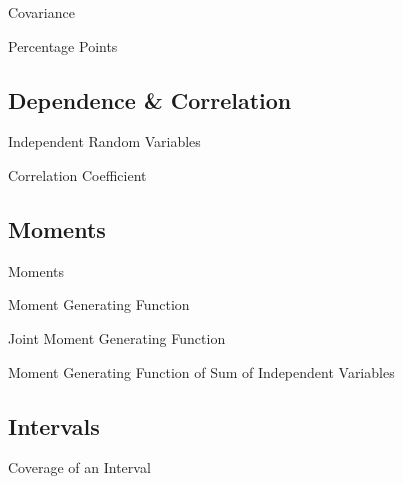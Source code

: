 \documentclass[11pt,a4paper]{article}
\begin{document}
\begin{definition}{Covariance}

\end{definition}

\begin{definition}{Percentage Points}

\end{definition}

\subsection{Dependence \& Correlation}

\begin{definition}{Independent Random Variables}
\end{definition}

\begin{definition}{Correlation Coefficient}
\end{definition}

\subsection{Moments}

\begin{definition}{Moments}

\end{definition}

\begin{definition}{Moment Generating Function}
\end{definition}

\begin{definition}{Joint Moment Generating Function}
\end{definition}

\begin{remark}{Moment Generating Function of Sum of Independent Variables}

\end{remark}

\subsection{Intervals}

\begin{definition}{Coverage of an Interval}

\end{definition}
\end{document}
